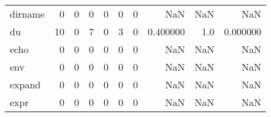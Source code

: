 \begin{tabular}{lrrrrrrrrr}
dirname   &                                                  0 &                                                  0 &                                                  0 &                                                  0 &                                                  0 &                                                  0 &                                                NaN &                                    NaN &                                  NaN \\
du        &                                                 10 &                                                  0 &                                                  7 &                                                  0 &                                                  3 &                                                  0 &                                           0.400000 &                                    1.0 &                             0.000000 \\
echo      &                                                  0 &                                                  0 &                                                  0 &                                                  0 &                                                  0 &                                                  0 &                                                NaN &                                    NaN &                                  NaN \\
env       &                                                  0 &                                                  0 &                                                  0 &                                                  0 &                                                  0 &                                                  0 &                                                NaN &                                    NaN &                                  NaN \\
expand    &                                                  0 &                                                  0 &                                                  0 &                                                  0 &                                                  0 &                                                  0 &                                                NaN &                                    NaN &                                  NaN \\
expr      &                                                  0 &                                                  0 &                                                  0 &                                                  0 &                                                  0 &                                                  0 &                                                NaN &                                    NaN &                                  NaN \\

\end{tabular}
